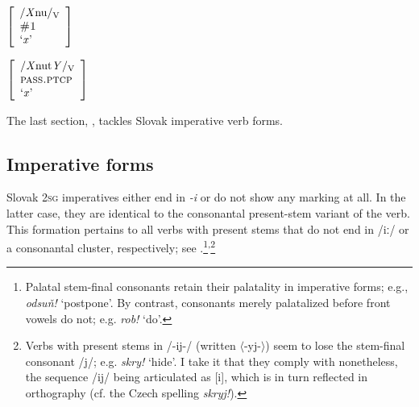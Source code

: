 \documentclass[output=paper,colorlinks,citecolor=brown,
]{langscibook}
\begin{document}
\begin{minipage}[t]{0.27\textwidth}
\ea\label{ex:rulePASS_t_2}
$\left[
\begin{array}{l}
    \text{/\textit{X}nu/\textsubscript{V}} \\
    \textsc{\#1} \\
    \text{`\textit{x}'}
\end{array}
\right] $ 
\z
\end{minipage}%
\begin{minipage}[t]{0.45\textwidth}
\begin{exe}
\exi{$\longleftrightarrow$}
$\left[
\begin{array}{l}
    \text{/\textit{X}nut\textit{Y}/\textsubscript{V}} \\
    \textsc{pass.ptcp} \\
    \text{`\textit{x}'}
\end{array}
\right] $
\end{exe}
\end{minipage}

\bigskip

\noindent The last section, , tackles Slovak imperative verb forms.


\subsection{Imperative forms}\label{sec:IMP}

Slovak \textsc{2sg} imperatives either end in \textit{-i} or do not show any marking at all. In the latter case, they are identical to the consonantal present-stem variant of the verb. This formation pertains to all verbs with present stems that do not end in /iː/ or a consonantal cluster, respectively; see .\footnote{Palatal stem-final consonants retain their palatality in imperative forms; e.g., \textit{odsuň!} `postpone'. By contrast, consonants merely palatalized before front vowels do not; e.g. \textit{rob!} `do'.}\textsuperscript{,}\footnote{Verbs with present stems in /-ij-/ (written $\langle$-yj-$\rangle$) seem to lose the stem-final consonant /j/; e.g. \textit{skry!} `hide'. I take it that they comply with  nonetheless, the sequence /ij/ being articulated as [i], which is in turn reflected in orthography (cf. the Czech spelling \textit{skryj!}).}
\end{document}
